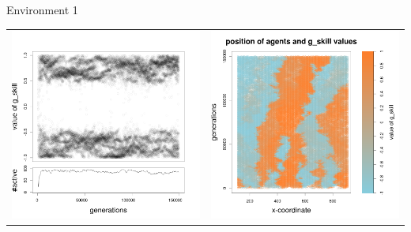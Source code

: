 \documentclass[8pt, handout=show,notes=show]{beamer}
\begin{document}
\begin{frame}{Environment 1}
\begin{table}[H]
\begin{tabular}{cc}
 \newline
 \includegraphics[width=\imgSize]{../images/5StaticEnv/Gplot9_staticEnv1}&\includegraphics[width=\imgSize]{../images/5StaticEnv/Gplot9Static_staticEnv1}\\
\end{tabular}

\end{table}
\end{frame}
\end{document}
